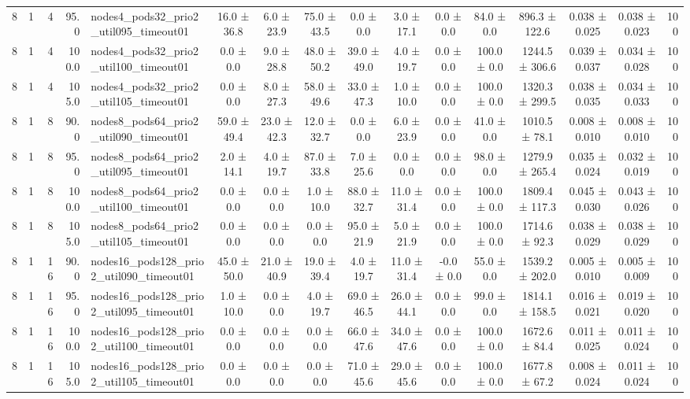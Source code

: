 \begin{tabular}{r r r r l c c c c c c c c c c r}
8 & 1 & 4 & 95.0 & nodes4\_pods32\_prio2\_util095\_timeout01 & 16.0 ± 36.8 & 6.0 ± 23.9 & 75.0 ± 43.5 & 0.0 ± 0.0 & 3.0 ± 17.1 & 0.0 ± 0.0 & 84.0 ± 0.0 & 896.3 ± 122.6 & 0.038 ± 0.025 & 0.038 ± 0.023 & 100 \\
8 & 1 & 4 & 100.0 & nodes4\_pods32\_prio2\_util100\_timeout01 & 0.0 ± 0.0 & 9.0 ± 28.8 & 48.0 ± 50.2 & 39.0 ± 49.0 & 4.0 ± 19.7 & 0.0 ± 0.0 & 100.0 ± 0.0 & 1244.5 ± 306.6 & 0.039 ± 0.037 & 0.034 ± 0.028 & 100 \\
8 & 1 & 4 & 105.0 & nodes4\_pods32\_prio2\_util105\_timeout01 & 0.0 ± 0.0 & 8.0 ± 27.3 & 58.0 ± 49.6 & 33.0 ± 47.3 & 1.0 ± 10.0 & 0.0 ± 0.0 & 100.0 ± 0.0 & 1320.3 ± 299.5 & 0.038 ± 0.035 & 0.034 ± 0.033 & 100 \\
8 & 1 & 8 & 90.0 & nodes8\_pods64\_prio2\_util090\_timeout01 & 59.0 ± 49.4 & 23.0 ± 42.3 & 12.0 ± 32.7 & 0.0 ± 0.0 & 6.0 ± 23.9 & 0.0 ± 0.0 & 41.0 ± 0.0 & 1010.5 ± 78.1 & 0.008 ± 0.010 & 0.008 ± 0.010 & 100 \\
8 & 1 & 8 & 95.0 & nodes8\_pods64\_prio2\_util095\_timeout01 & 2.0 ± 14.1 & 4.0 ± 19.7 & 87.0 ± 33.8 & 7.0 ± 25.6 & 0.0 ± 0.0 & 0.0 ± 0.0 & 98.0 ± 0.0 & 1279.9 ± 265.4 & 0.035 ± 0.024 & 0.032 ± 0.019 & 100 \\
8 & 1 & 8 & 100.0 & nodes8\_pods64\_prio2\_util100\_timeout01 & 0.0 ± 0.0 & 0.0 ± 0.0 & 1.0 ± 10.0 & 88.0 ± 32.7 & 11.0 ± 31.4 & 0.0 ± 0.0 & 100.0 ± 0.0 & 1809.4 ± 117.3 & 0.045 ± 0.030 & 0.043 ± 0.026 & 100 \\
8 & 1 & 8 & 105.0 & nodes8\_pods64\_prio2\_util105\_timeout01 & 0.0 ± 0.0 & 0.0 ± 0.0 & 0.0 ± 0.0 & 95.0 ± 21.9 & 5.0 ± 21.9 & 0.0 ± 0.0 & 100.0 ± 0.0 & 1714.6 ± 92.3 & 0.038 ± 0.029 & 0.038 ± 0.029 & 100 \\
8 & 1 & 16 & 90.0 & nodes16\_pods128\_prio2\_util090\_timeout01 & 45.0 ± 50.0 & 21.0 ± 40.9 & 19.0 ± 39.4 & 4.0 ± 19.7 & 11.0 ± 31.4 & -0.0 ± 0.0 & 55.0 ± 0.0 & 1539.2 ± 202.0 & 0.005 ± 0.010 & 0.005 ± 0.009 & 100 \\
8 & 1 & 16 & 95.0 & nodes16\_pods128\_prio2\_util095\_timeout01 & 1.0 ± 10.0 & 0.0 ± 0.0 & 4.0 ± 19.7 & 69.0 ± 46.5 & 26.0 ± 44.1 & 0.0 ± 0.0 & 99.0 ± 0.0 & 1814.1 ± 158.5 & 0.016 ± 0.021 & 0.019 ± 0.020 & 100 \\
8 & 1 & 16 & 100.0 & nodes16\_pods128\_prio2\_util100\_timeout01 & 0.0 ± 0.0 & 0.0 ± 0.0 & 0.0 ± 0.0 & 66.0 ± 47.6 & 34.0 ± 47.6 & 0.0 ± 0.0 & 100.0 ± 0.0 & 1672.6 ± 84.4 & 0.011 ± 0.025 & 0.011 ± 0.024 & 100 \\
8 & 1 & 16 & 105.0 & nodes16\_pods128\_prio2\_util105\_timeout01 & 0.0 ± 0.0 & 0.0 ± 0.0 & 0.0 ± 0.0 & 71.0 ± 45.6 & 29.0 ± 45.6 & 0.0 ± 0.0 & 100.0 ± 0.0 & 1677.8 ± 67.2 & 0.008 ± 0.024 & 0.011 ± 0.024 & 100 \\

\end{tabular}
